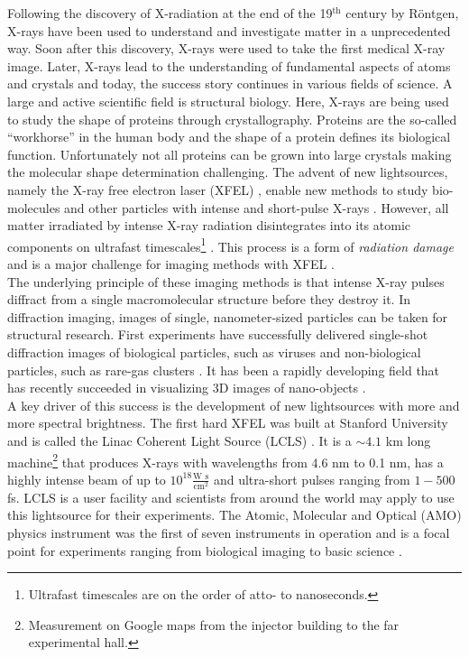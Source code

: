 Following the discovery of X-radiation at the end of the 19$^{\text{th}}$ century by R\"ontgen, X-rays have been used to understand and investigate matter in a unprecedented way. Soon after this discovery, X-rays were used to take the first medical X-ray image. Later, X-rays lead to the understanding of fundamental aspects of atoms \citep{Siegbahn-NP} and crystals \citep{Laue-NP,Bragg-NP} and today, the success story continues in various fields of science. A large and active scientific field is structural biology. Here, X-rays are being used to study the shape of proteins through crystallography. Proteins are the so-called ``workhorse'' in the human body and the shape of a protein defines its biological function. Unfortunately not all proteins can be grown into large crystals making the molecular shape determination challenging. The advent of new lightsources, namely the X-ray free electron laser (XFEL) \citep{Ackermann-2007-NPho}, enable new methods to study bio-molecules and other particles with intense and short-pulse X-rays \citep{Chapman-2006-NatPhys,Chapman-2011-Nature}. However, all matter irradiated by intense X-ray radiation disintegrates into its atomic components on ultrafast timescales\footnote{Ultrafast timescales are on the order of atto- to nanoseconds.} \citep{Neutze-2000-Nature}. This process is a form of \textit{radiation damage} and is a major challenge for imaging methods with XFEL \citep{Aquila-2015-StrucDyn}.\\[1\baselineskip]
%
The underlying principle of these imaging methods is that intense X-ray pulses diffract from a single macromolecular structure before they destroy it. In diffraction imaging, images of single, nanometer-sized particles can be taken for structural research. First experiments have successfully delivered single-shot diffraction images of biological particles, such as viruses \citep{Seibert-2011-Nature} and non-biological particles, such as rare-gas clusters \citep{Gomez-2014-Science}. It has been a rapidly developing field that has recently succeeded in visualizing 3D images of nano-objects \citep{Ekeberg-2015-PRL,Barke-2015-NatComm}.\\[1\baselineskip]
%
A key driver of this success is the development of new lightsources with more and more spectral brightness. The first hard XFEL was built at Stanford University and is called the Linac Coherent Light Source (LCLS) \citep{Emma-2010-NatPho}. It is a $\sim 4.1$ km long machine\footnote{Measurement on Google maps from the injector building to the far experimental hall.} that produces X-rays with wavelengths from 4.6 nm to 0.1 nm, has a highly intense beam of up to $10^{18} \tfrac{\text{W s}}{\text{cm}^{2}}$ and ultra-short pulses ranging from $1-500$ fs. LCLS is a user facility and scientists from around the world may apply to use this lightsource for their experiments. The Atomic, Molecular and Optical (AMO) physics instrument was the first of seven instruments in operation and is a focal point for experiments ranging from biological imaging to basic science \citep{Bostedt-2016-RMP}.\\[1\baselineskip]
